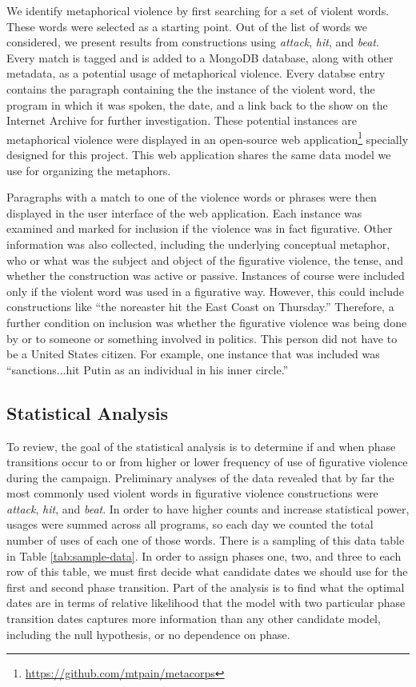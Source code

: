 We identify metaphorical violence by first searching for a set of violent words.
These words were selected as a starting point. Out of the list of words we 
considered, we present results from constructions using \textit{attack}, \textit{hit},
and \textit{beat}. 
Every match is tagged and is added to a MongoDB database, along with other metadata, 
as a potential usage of metaphorical violence. Every databse entry contains 
the paragraph containing the the instance of the violent word, the program
in which it was spoken, the date, and a link back to the show on the Internet
Archive for further investigation. These potential instances are metaphorical
violence were displayed in an open-source 
web application\footnote{\url{https://github.com/mtpain/metacorps}} specially 
designed for this project. This web application shares the same data model we
use for organizing the metaphors. 

Paragraphs with a match to one of the violence words or phrases were then
displayed in the user interface of the web application. 
Each instance was examined and marked for inclusion if the 
violence was in fact figurative.
Other information was also collected, including the underlying conceptual
metaphor, who or what was the subject and
object of the figurative violence, the tense, and whether the construction was
active or passive. Instances of course were included only if the violent word
was used in a figurative way. However, this could include constructions like
``the noreaster hit the East Coast on Thursday.'' Therefore, a further condition
on inclusion was whether the figurative violence was being done by or to someone
or something involved in politics. This person did not have to be a United States
citizen. For example, one instance that was included was 
``sanctions...hit Putin as an individual in his inner circle.'' 


\subsection{Statistical Analysis}
\label{sub:statistical-analysis}

To review, the goal of the statistical analysis is to determine if and when
phase transitions occur to or from higher or lower frequency of use 
of figurative violence
during the campaign. Preliminary analyses of the data revealed that by far
the most commonly used violent words in figurative violence constructions were
\textit{attack}, \textit{hit}, and \textit{beat}. In order to have higher 
counts and increase statistical power, usages were summed across all programs,
so each day we counted the total number of uses of each one of those words.
There is a sampling of this data table in Table \ref{tab:sample-data}. In 
order to assign phases one, two, and three to each row of this table, we
must first decide what candidate dates we should use for the first and
second phase transition. Part of the analysis is to find what the optimal 
dates are in terms of relative likelihood that the model with two particular
phase transition dates captures more information than any other candidate
model, including the null hypothesis, or no dependence on phase.

